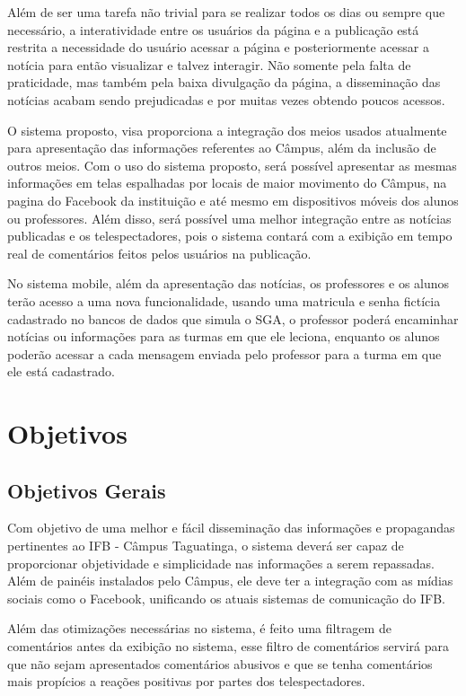 Além de ser uma tarefa não trivial para se realizar todos os dias ou sempre que necessário, a interatividade entre os usuários da página e a
publicação está restrita a necessidade do usuário acessar a página e posteriormente acessar a notícia para então visualizar e talvez interagir. Não somente pela falta de praticidade, mas também pela baixa divulgação da página, a disseminação das notícias acabam sendo prejudicadas e por muitas vezes obtendo poucos acessos.

O sistema proposto, visa proporciona a integração dos meios usados atualmente para apresentação das informações referentes ao Câmpus, além da inclusão de outros meios. Com o uso do sistema proposto, será possível apresentar as mesmas informações
em telas espalhadas por locais de maior movimento do Câmpus, na pagina do Facebook
da instituição e até mesmo em dispositivos móveis dos alunos ou professores. Além disso, será possível uma melhor integração entre as notícias publicadas e os telespectadores, pois o sistema contará com a exibição em tempo real de comentários feitos pelos usuários na publicação.

No sistema mobile, além da apresentação das notícias, os professores e os alunos terão acesso a uma nova funcionalidade, usando uma matricula e senha fictícia cadastrado no bancos de dados que simula o SGA, o professor poderá encaminhar notícias ou informações para as turmas em que ele leciona, enquanto os alunos poderão acessar a cada mensagem enviada pelo professor para a turma em que ele está cadastrado.

\section{Objetivos}
\subsection{Objetivos Gerais}
Com objetivo de uma melhor e fácil disseminação das informações e propagandas pertinentes ao IFB - Câmpus Taguatinga, o sistema deverá ser capaz de proporcionar objetividade e simplicidade nas informações a serem repassadas. Além de painéis instalados pelo Câmpus, ele deve ter a integração com as mídias sociais como o Facebook, unificando os atuais sistemas de comunicação do IFB.

Além das otimizações necessárias no sistema, é feito uma filtragem de comentários antes da exibição no sistema, esse filtro de comentários servirá para que não sejam apresentados comentários abusivos e que se tenha comentários mais propícios a reações positivas por partes dos telespectadores.

